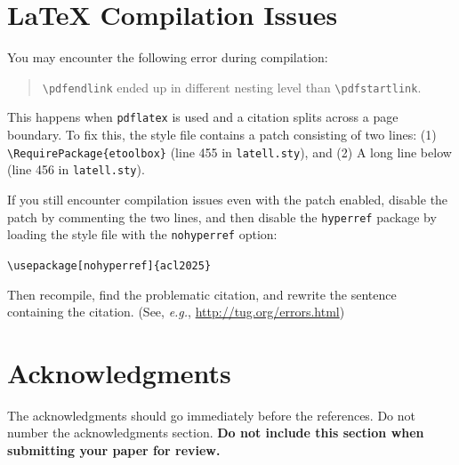 \documentclass[11pt,a4paper]{article}
\begin{document}
\section{\LaTeX{} Compilation Issues}
You may encounter the following error during compilation: 
\begin{quote}
{\small\verb|\pdfendlink|} ended up in different nesting level than {\small\verb|\pdfstartlink|}.
\end{quote}
This happens when \texttt{\small pdflatex} is used and a citation splits across a page boundary.
To fix this, the style file contains a patch consisting of two lines:
(1) {\small\verb|\RequirePackage{etoolbox}|} (line 455 in \texttt{\small latell.sty}), and
(2) A long line below (line 456 in \texttt{\small latell.sty}).

If you still encounter compilation issues even with the patch enabled, disable the patch by commenting the two lines, and then disable the \texttt{\small hyperref} package by loading the style file with the \texttt{\small nohyperref} option:

\noindent
{\small\verb|\usepackage[nohyperref]{acl2025}|}

\noindent
Then recompile, find the problematic citation, and rewrite the sentence containing the citation. (See, {\em e.g.}, \url{http://tug.org/errors.html})

\section*{Acknowledgments}

The acknowledgments should go immediately before the references. Do not number the acknowledgments section.
\textbf{Do not include this section when submitting your paper for review.}




\end{document}
